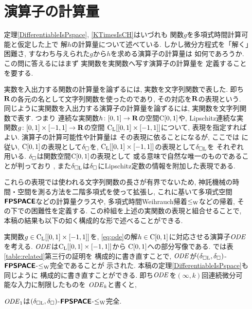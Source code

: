 \section{演算子の計算量}

定理\ref{DifferentiableIsPspace}, 
\ref{KTimesIsCH}はいづれも
関数$g$を多項式時間計算可能と仮定した上で
解$h$の計算量について述べている. 
しかし微分方程式を「解く」困難さ, 
すなわち与えられた$g$から$h$を求める演算子の計算量は
如何であろうか. 
この問に答えるにはまず
実関数を実関数へ写す演算子の計算量を
定義することを要する. 

実数を入出力する関数の計算量を論ずるには, 
実数を文字列関数で表した. 
即ち$\mathbf R$の各元の名として文字列関数を使ったのであり, 
その対応を$\mathbf R$の表現という. 
同じように実関数を入出力する演算子の計算量を論ずるには, 
実関数を文字列関数で表す. 
つまり
連続な実関数$h \colon [0,1] \to \mathbf R$の空間$\mathrm C [0, 1]$や, 
Lipschitz連続な実関数$g \colon [0, 1] \times [-1, 1] \to \mathbf R$の空間
$\mathrm C _{\mathrm L} [[0, 1] \times [-1, 1]]$について, 
表現を指定すればよい. 
演算子の計算可能性や計算量は
その表現に依ることになるが, 
ここでは
\cite{kawamura2010operators}に従い, 
$\mathrm C [0, 1]$の表現として$\delta _\square$を, 
$\mathrm C _{\mathrm L} [[0, 1] \times [-1, 1]]$の表現として$\delta _{\square \mathrm L}$を
それぞれ用いる. 
$\delta _\square$は関数空間$\mathrm C [0, 1]$の表現として
或る意味で自然な唯一のものであることが判っており
\cite{kawamura11:_funct_space_repres_and_polyn_time_comput}, 
また$\delta _{\square \mathrm L}$は$\delta _\square$にLipschitz定数の情報を附加した表現である. 

これらの表現では使われる文字列関数の長さが有界でないため, 
神託機械の時間・空間を測る方法を二階多項式を使って拡張し, 
これに基いて多項式空間$\text{\bfseries \sffamily \upshape FPSPACE}$などの計算量クラスや, 
多項式時間Weihrauch帰着$\leq _{\mathrm W}$などの帰着, 
その下での困難性を定義する\cite{kawamura2010operators}. 
この枠組を上述の実関数の表現と組合せることで, 
本稿の結果も以下の如く構成的な形で述べることができる. 

実関数$g \in \mathrm C _{\mathrm L} [[0, 1] \times [-1, 1]]$を, 
\eqref{eq:ode}の解$h \in \mathrm C [0, 1]$に対応させる演算子$\mathit{ODE}$を考える. 
$\mathit{ODE}$は$\mathrm C _{\mathrm L} [[0, 1] \times [-1, 1]]$から
$\mathrm C [0, 1]$への部分写像である. 
\cite[定理4.9]{kawamura2010operators}では表\ref{table:related}第三行の証明を
構成的に書き直すことで, 
$\mathit{ODE}$が$(\delta _{\square \mathrm L}, \delta _\square)$-$\text{\bfseries \sffamily \upshape FPSPACE}$-$\leq _{\mathrm W}$完全であることが
示された. 
本稿の定理\ref{DifferentiableIsPspace}も同じように
構成的に書き直すことができる. 
即ち$\mathit{ODE}$を$(\infty, k)$回連続微分可能な入力に制限したものを
$\mathit{ODE} _k$と書くと, 

\begin{theorem}
\label{theorem: C1 constructive}
$\mathit{ODE} _1$は$(\delta _{\square \mathrm L}, \delta _\square)$-$\text{\bfseries \sffamily \upshape FPSPACE}$-$\leq _{\mathrm W}$完全. 
\end{theorem}

